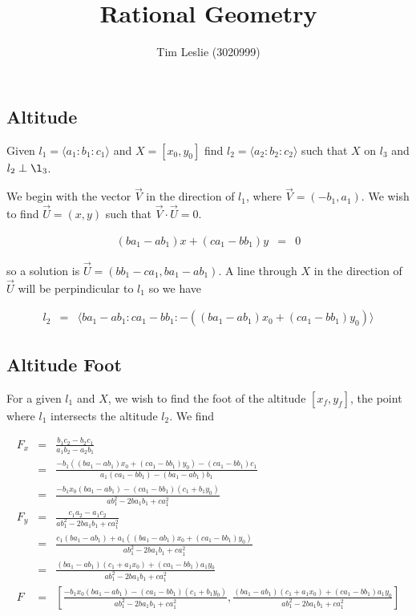\documentclass{article}
\title{Rational Geometry}
\author{Tim Leslie (3020999)}
\begin{document}
\maketitle

\section{}

\subsection{Altitude}

Given $l_1 = \langle a_1:b_1:c_1\rangle$ and $X = [x_0, y_0]$ find $l_2 = \langle a_2:b_2:c_2\rangle$ such that $X$ on $l_3$ and $l_2 \perp \l_3$.

We begin with the vector $\vec{V}$ in the direction of $l_1$, where $\vec{V} = (-b_1, a_1)$. We wish to find $\vec{U} = (x, y)$ such that $\vec{V}\cdot\vec{U} = 0$.

\begin{eqnarray}
(ba_1 - ab_1)x + (ca_1 - bb_1)y & = & 0
\end{eqnarray}

so a solution is $\vec{U} = (bb_1 - ca_1, ba_1 - ab_1)$. A line through $X$ in the direction of $\vec{U}$ will be perpindicular to $l_1$ so we have

\begin{eqnarray}
l_2 & = & \langle ba_1 - ab_1:ca_1 - bb_1:-((ba_1 - ab_1)x_0 + (ca_1 - bb_1)y_0) \rangle
\end{eqnarray}


\subsection{Altitude Foot}

For a given $l_1$ and $X$, we wish to find the foot of the altitude $[x_f, y_f]$, the point where $l_1$ intersects the altitude $l_2$. We find

\begin{eqnarray}
F_x & = & \frac{b_1c_2 - b_2c_1}{a_1b_2 - a_2b_1}\\
    & = & \frac{-b_1((ba_1 - ab_1)x_0 + (ca_1 - bb_1)y_0) - (ca_1 - bb_1)c_1}{a_1(ca_1 - bb_1) - (ba_1 - ab_1)b_1}\\
    & = & \frac{-b_1x_0(ba_1 - ab_1) - (ca_1 - bb_1)(c_1 + b_1y_0) }{ab_1^2 - 2ba_1b_1 + ca_1^2}\\
F_y & = & \frac{c_1a_2 - a_1c_2}{ab_1^2 - 2ba_1b_1 + ca_1^2}\\
    & = & \frac{c_1(ba_1 - ab_1) + a_1((ba_1 - ab_1)x_0 + (ca_1 - bb_1)y_0)}{ab_1^2 - 2ba_1b_1 + ca_1^2}\\
    & = & \frac{(ba_1 - ab_1)(c_1 + a_1x_0) + (ca_1 - bb_1)a_1y_0}{ab_1^2 - 2ba_1b_1 + ca_1^2}\\
F & = & \left[\frac{-b_1x_0(ba_1 - ab_1) - (ca_1 - bb_1)(c_1 + b_1y_0) }{ab_1^2 - 2ba_1b_1 + ca_1^2} , \frac{(ba_1 - ab_1)(c_1 + a_1x_0) + (ca_1 - bb_1)a_1y_0}{ab_1^2 - 2ba_1b_1 + ca_1^2}\right]\nonumber
\end{eqnarray}
\end{document}
